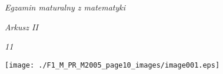 \documentclass[a4paper,12pt]{article}
\begin{document}
{\it Egzamin maturalny z matematyki}

{\it Arkusz II}

{\it 11}
\begin{center}
\texttt{[image: ./F1\_M\_PR\_M2005\_page10\_images/image001.eps]}
\end{center}
\end{document}
